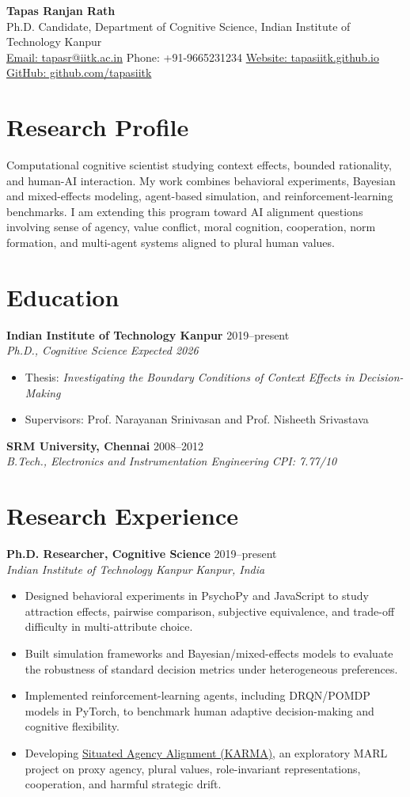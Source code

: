 \documentclass[10pt, a4paper]{extarticle}
\newcommand{\sectiontight}[1]{\vspace{6pt}\section{#1}}
\newcommand{\entry}[4]{
  \textbf{#1} \hfill #2\\
  \textit{#3} \hfill \textit{#4}\vspace{1pt}
}
\begin{document}
{\huge \textbf{Tapas Ranjan Rath}}\\[-1pt]
Ph.D. Candidate, Department of Cognitive Science, Indian Institute of Technology Kanpur\\
\href{mailto:tapasr@iitk.ac.in}{Email: tapasr@iitk.ac.in}
\quad
Phone: +91-9665231234
\quad
\href{https://tapasiitk.github.io/}{Website: tapasiitk.github.io}
\quad
\href{https://github.com/tapasiitk}{GitHub: github.com/tapasiitk}

\sectiontight{Research Profile}
Computational cognitive scientist studying context effects, bounded rationality, and human-AI interaction. My work combines behavioral experiments, Bayesian and mixed-effects modeling, agent-based simulation, and reinforcement-learning benchmarks. I am extending this program toward AI alignment questions involving sense of agency, value conflict, moral cognition, cooperation, norm formation, and multi-agent systems aligned to plural human values.

\sectiontight{Education}
\entry{Indian Institute of Technology Kanpur}{2019--present}{Ph.D., Cognitive Science}{Expected 2026}
\begin{itemize}
  \item Thesis: \textit{Investigating the Boundary Conditions of Context Effects in Decision-Making}
  \item Supervisors: Prof. Narayanan Srinivasan and Prof. Nisheeth Srivastava
\end{itemize}
\entry{SRM University, Chennai}{2008--2012}{B.Tech., Electronics and Instrumentation Engineering}{CPI: 7.77/10}

\sectiontight{Research Experience}
\entry{Ph.D. Researcher, Cognitive Science}{2019--present}{Indian Institute of Technology Kanpur}{Kanpur, India}
\begin{itemize}
  \item Designed behavioral experiments in PsychoPy and JavaScript to study attraction effects, pairwise comparison, subjective equivalence, and trade-off difficulty in multi-attribute choice.
  \item Built simulation frameworks and Bayesian/mixed-effects models to evaluate the robustness of standard decision metrics under heterogeneous preferences.
  \item Implemented reinforcement-learning agents, including DRQN/POMDP models in PyTorch, to benchmark human adaptive decision-making and cognitive flexibility.
  \item Developing \href{https://github.com/tapasiitk/situated-agency-alignment}{Situated Agency Alignment (KARMA)}, an exploratory MARL project on proxy agency, plural values, role-invariant representations, cooperation, and harmful strategic drift.
\end{itemize}
\end{document}
